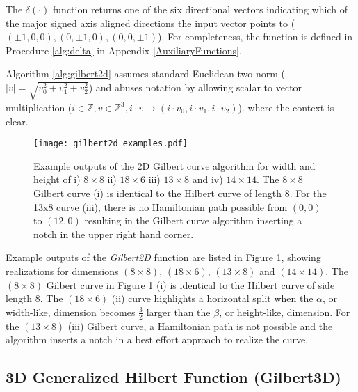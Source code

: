 The $\delta(\cdot)$ function returns one of the six directional vectors indicating which of
the major signed axis aligned directions the input vector points to ($(\pm1,0,0), (0,\pm1,0),(0,0,\pm1)$).
For completeness, the function is defined in Procedure \ref{alg:delta} in Appendix \ref{AuxiliaryFunctions}.

Algorithm \ref{alg:gilbert2d} assumes standard Euclidean two norm ($|v| = \sqrt{v_0^2 + v_1^2 + v_2^2}$)
and abuses notation by allowing scalar to vector multiplication ($i \in \mathbb{Z}, v \in \mathbb{Z}^3, i \cdot v \to ( i \cdot v_0, i \cdot v_1, i \cdot v_2 )$).
where the context is clear.

\begin{figure}[h]
  \centering
  \texttt{[image: gilbert2d\_examples.pdf]}
  \caption{ Example outputs of the 2D Gilbert curve algorithm for width and height of i) $8 \times 8$ ii) $18 \times 6$ iii) $13 \times 8$ and iv) $14 \times 14$.
            The $8 \times 8$ Gilbert curve (i) is identical to the Hilbert curve of length $8$.
            For the 13x8 curve (iii), there is no Hamiltonian path possible from $(0,0)$ to $(12,0)$ resulting in the Gilbert curve algorithm inserting a notch
            in the upper right hand corner. }
  \label{fig:gilbert2d_examples}
\end{figure}

Example outputs of the \textit{Gilbert2D} function are listed in Figure \ref{fig:gilbert2d_examples}, showing realizations for dimensions
$(8 \times 8)$, $(18 \times 6)$, $(13 \times 8)$ and $(14 \times 14)$.
The $(8 \times 8)$ Gilbert curve in Figure \ref{fig:gilbert2d_examples} (i) is identical to the Hilbert curve of side length 8.
The $(18 \times 6)$ (ii) curve highlights a horizontal split when the $\alpha$, or width-like, dimension becomes $\frac{3}{2}$ larger than the
$\beta$, or height-like, dimension.
For the $(13 \times 8)$ (iii) Gilbert curve, a Hamiltonian path is not possible and the algorithm inserts a notch in a best effort approach to realize the curve.


\subsection{3D Generalized Hilbert Function (Gilbert3D)}


